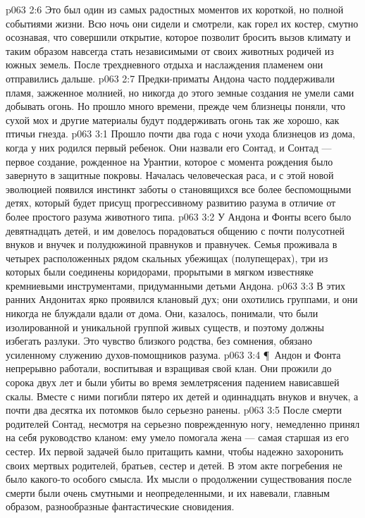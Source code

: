\vs p063 2:6 Это был один из самых радостных моментов их короткой, но полной событиями жизни. Всю ночь они сидели и смотрели, как горел их костер, смутно осознавая, что совершили открытие, которое позволит бросить вызов климату и таким образом навсегда стать независимыми от своих животных родичей из южных земель. После трехдневного отдыха и наслаждения пламенем они отправились дальше.
\vs p063 2:7 Предки\hyp{}приматы Андона часто поддерживали пламя, зажженное молнией, но никогда до этого земные создания не умели сами добывать огонь. Но прошло много времени, прежде чем близнецы поняли, что сухой мох и другие материалы будут поддерживать огонь так же хорошо, как птичьи гнезда.
\vs p063 3:1 Прошло почти два года с ночи ухода близнецов из дома, когда у них родился первый ребенок. Они назвали его Сонтад, и Сонтад --- первое создание, рожденное на Урантии, которое с момента рождения было завернуто в защитные покровы. Началась человеческая раса, и с этой новой эволюцией появился инстинкт заботы о становящихся все более беспомощными детях, который будет присущ прогрессивному развитию разума в отличие от более простого разума животного типа.
\vs p063 3:2 У Андона и Фонты всего было девятнадцать детей, и им довелось порадоваться общению с почти полусотней внуков и внучек и полудюжиной правнуков и правнучек. Семья проживала в четырех расположенных рядом скальных убежищах (полупещерах), три из которых были соединены коридорами, прорытыми в мягком известняке кремниевыми инструментами, придуманными детьми Андона.
\vs p063 3:3 В этих ранних Андонитах ярко проявился клановый дух; они охотились группами, и они никогда не блуждали вдали от дома. Они, казалось, понимали, что были изолированной и уникальной группой живых существ, и поэтому должны избегать разлуки. Это чувство близкого родства, без сомнения, обязано усиленному служению духов\hyp{}помощников разума.
\vs p063 3:4 \P\ Андон и Фонта непрерывно работали, воспитывая и взращивая свой клан. Они прожили до сорока двух лет и были убиты во время землетрясения падением нависавшей скалы. Вместе с ними погибли пятеро их детей и одиннадцать внуков и внучек, а почти два десятка их потомков было серьезно ранены.
\vs p063 3:5 После смерти родителей Сонтад, несмотря на серьезно поврежденную ногу, немедленно принял на себя руководство кланом: ему умело помогала жена --- самая старшая из его сестер. Их первой задачей было притащить камни, чтобы надежно захоронить своих мертвых родителей, братьев, сестер и детей. В этом акте погребения не было какого\hyp{}то особого смысла. Их мысли о продолжении существования после смерти были очень смутными и неопределенными, и их навевали, главным образом, разнообразные фантастические сновидения.
